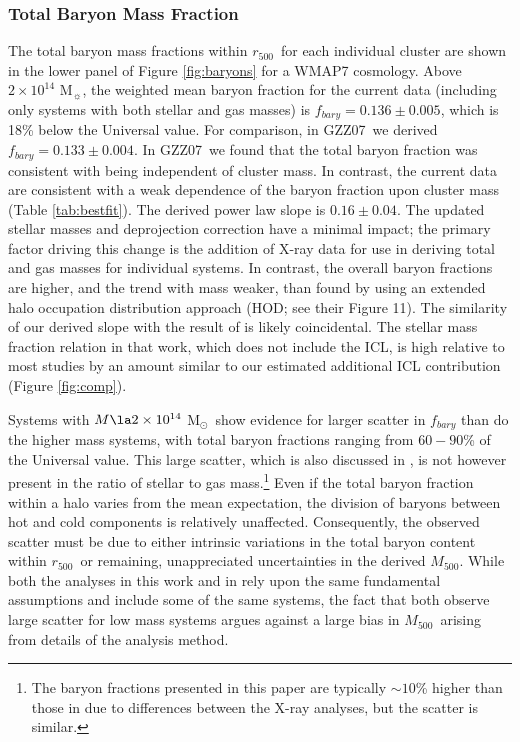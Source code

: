 \documentclass[preprint]{emulateapj}
\newcommand{\msun}{M$_\odot$}
\newcommand\rfive{$r_{500}$}
\newcommand\ptwo{GZZ07}
\newcommand\mfive{${M}_{500}$}
\begin{document}
\subsubsection{Total Baryon Mass Fraction}

The total baryon mass fractions within \rfive\ for each individual
cluster are shown in the lower panel of Figure
\ref{fig:baryons} for a WMAP7 cosmology.
Above $2\times10^{14}$ M$_\sun$, the weighted mean baryon fraction for
the current data (including only systems with both stellar and gas
masses) is $f_{bary}=0.136\pm 0.005$, which is 18\% below the
Universal value. For comparison, in \ptwo\ we derived
$f_{bary}=0.133\pm 0.004$.  In \ptwo\ we found that the total baryon
fraction was consistent with being independent of cluster mass.  In
contrast, the current data are consistent with a weak dependence of
the baryon fraction upon cluster mass (Table \ref{tab:bestfit}).  The
derived power law slope is $0.16\pm0.04$.  The updated stellar masses
and deprojection correction have a minimal impact; the primary factor
driving this change is the addition of X-ray data for use in deriving
total and gas masses for individual systems.  In contrast, the overall
baryon fractions are higher, and the trend with mass weaker, than
found by \citet{leauthaud2012} using an extended halo occupation
distribution approach (HOD; see their Figure 11).  The similarity of
our derived slope with the result of
\citet[][$0.09\pm0.03$]{giodini2009} is likely coincidental. The
stellar mass fraction relation in that work, which does not include
the ICL, is high relative to most studies by an amount similar to our
estimated additional ICL contribution (Figure \ref{fig:comp}).

Systems with $M\la2\times10^{14}$ \msun\ show evidence for
larger scatter in $f_{bary}$ than do the higher mass systems, with
total baryon fractions ranging from $60-90$\% of the Universal value.
This large scatter, which is also discussed in \citet{sanderson2013},
is not however present in the ratio of stellar to gas
mass.\footnote{The baryon fractions presented in this paper are
  typically $\sim10$\% higher than those in \citet{sanderson2013} due
  to differences between the X-ray analyses, but the scatter is similar.}
Even if the total baryon fraction within a halo varies from the mean
expectation, the division of baryons between hot and cold components
is relatively unaffected.  Consequently, the observed scatter must be
due to either intrinsic variations in the total baryon content within
\rfive\ or remaining, unappreciated uncertainties in the derived
\mfive. While both the analyses in this work and in \citet{sanderson2013}
rely upon the same fundamental assumptions and include some of
the same systems, the fact that both observe large scatter for low
mass systems argues against a large bias in \mfive\ arising from details
of the analysis method. 
 
\end{document}
